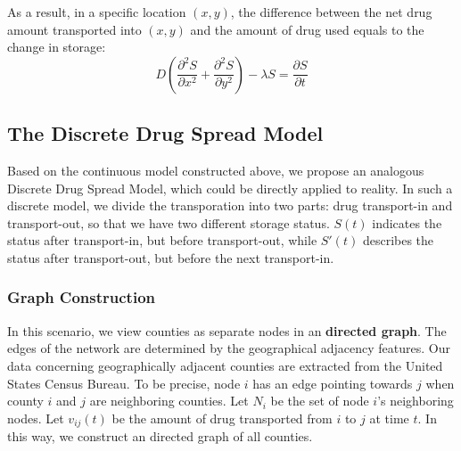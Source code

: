 
As a result, in a specific location $(x,y)$, the difference between the net drug amount transported into $(x,y)$ and the amount of drug used equals to the change in storage:
\begin{equation}
D(\frac{\partial^2 S}{\partial x^2} + \frac{\partial^2 S}{\partial y^2}) - \lambda S = \frac{\partial S}{\partial t} 
\end{equation}
\begin{comment}
$S$, however, is unknown. We substitute (1) into (3), and eliminate the common factor $k$ from both sides of the equation
\begin{equation}
D(\frac{\partial^2 F}{\partial x^2} + \frac{\partial^2 F}{\partial y^2}) - \lambda F = \frac{\partial F}{\partial t}
\end{equation}
\end{comment}

\subsection{The Discrete Drug Spread Model}
Based on the continuous model constructed above, we propose an analogous Discrete Drug Spread Model, which could be directly applied to reality. In such a discrete model, we divide the transporation into two parts: drug transport-in and transport-out, so that we have two different storage status. $S(t)$ indicates the status after transport-in, but before transport-out, while $S'(t)$ describes the status after transport-out, but before the next transport-in.

\subsubsection{Graph Construction}
In this scenario, we view counties as separate nodes in an \textbf{directed graph}. The edges of the network are determined by the geographical adjacency features. Our data concerning geographically adjacent counties are extracted from the United States Census Bureau\cite{13}. To be precise, node $i$ has an edge pointing towards $j$ when county $i$ and $j$ are neighboring counties. Let $N_i$ be the set of node $i$'s neighboring nodes. Let $v_{ij}(t)$ be the amount of drug transported from $i$ to $j$ at time $t$. In this way, we construct an directed graph of all counties. 

